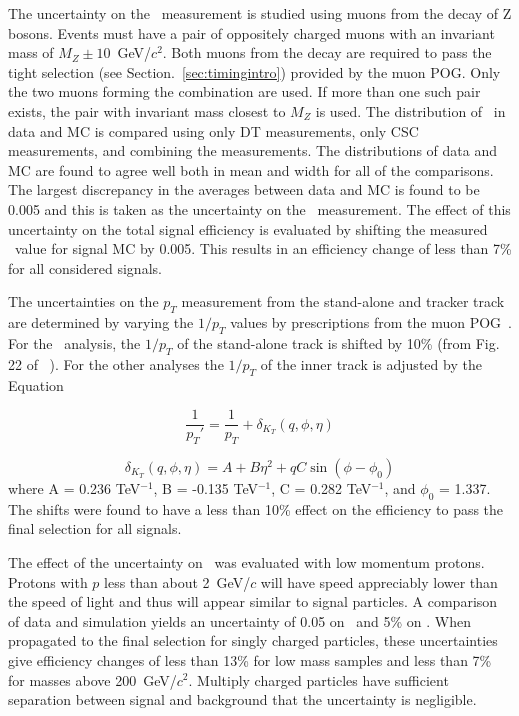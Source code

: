 The uncertainty on the \invbeta\ measurement is studied using muons from the decay of Z bosons. 
Events must have a pair of oppositely charged muons with an invariant mass of $M_Z \pm 10$~GeV/$c^2$. 
Both muons from the decay are required to pass the tight selection (see Section.~\ref{sec:timingintro}) provided by the muon POG.
Only the two muons forming the combination
are used. If more than one such pair exists, the pair with invariant mass closest to $M_Z$ is used. 
The distribution of \invbeta\ in data and MC is compared using only DT measurements, only CSC measurements, and combining the measurements.
The distributions of data and MC are found to agree well both in mean and width for all of the comparisons.
The largest discrepancy in the averages between data and MC is found to be 0.005 and this is taken as the uncertainty on the \invbeta\ measurement.
The effect of this uncertainty on the total signal efficiency is evaluated by shifting the measured \invbeta\ value for signal MC by 0.005.
This results in an efficiency change of less than 7\% for all considered signals.

The uncertainties on the $p_T$ measurement from the stand-alone and tracker track are determined by
varying the $1/p_T$ values by prescriptions from the muon POG~\cite{2012JInst...7P0002T}. For the \muononly\
analysis, the $1/p_T$ of the stand-alone track is shifted by 10\% (from Fig. 22 of ~\cite{2012JInst...7P0002T}).
For the other analyses the $1/p_T$ of the inner track is adjusted by the Equation

\begin{equation}
 \frac{1}{p_T\prime} = \frac{1}{p_T} + \delta_{K_T}(q, \phi, \eta)
\end{equation}

\begin{equation}
 \delta_{K_T}(q, \phi, \eta) = A + B\eta^2 + qC\sin(\phi - \phi_0)
\end{equation}
where A = 0.236 TeV$^{-1}$, B = -0.135 TeV$^{-1}$,
C = 0.282 TeV$^{-1}$, and $\phi_0$ = 1.337. The shifts were found to have a less than 10\% effect on the efficiency to pass the final selection for all signals.

The effect of the uncertainty on \dedx\ was evaluated with low momentum protons. Protons with $p$ less than  about 2~GeV/$c$ will have speed appreciably lower than the
speed of light and thus will appear similar to signal particles. A comparison of data and simulation yields an uncertainty of 0.05 on \ias\ and 5\% on \ih. %
When propagated to the final selection for singly charged particles, these uncertainties give efficiency changes of less than 13\% for low mass samples
and less than 7\% for masses above 200~GeV/$c^2$. Multiply charged particles have sufficient
separation between signal and background that the uncertainty is negligible.

